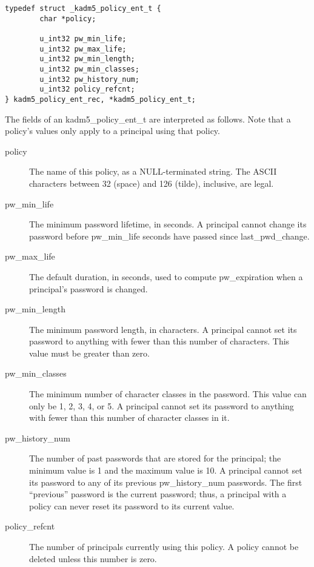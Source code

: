 \begin{verbatim}
typedef struct _kadm5_policy_ent_t {
        char *policy;

        u_int32 pw_min_life;
        u_int32 pw_max_life;
        u_int32 pw_min_length;
        u_int32 pw_min_classes;
        u_int32 pw_history_num;
        u_int32 policy_refcnt;
} kadm5_policy_ent_rec, *kadm5_policy_ent_t;
\end{verbatim}

The fields of an kadm5_policy_ent_t are interpreted as follows.
Note that a policy's values only apply to a principal using that
policy.

\begin{description}
\item[policy] The name of this policy, as a NULL-terminated string.
The ASCII characters between 32 (space) and 126 (tilde), inclusive,
are legal.

\item[pw_min_life] The minimum password lifetime, in seconds.
A principal cannot change its password before pw_min_life seconds have
passed since last_pwd_change.

\item[pw_max_life] The default duration, in seconds, used to compute
pw_expiration when a principal's password is changed.

\item[pw_min_length] The minimum password length, in characters.  A
principal cannot set its password to anything with fewer than this
number of characters.  This value must be greater than zero.

\item[pw_min_classes] The minimum number of character classes in the
password.  This value can only be 1, 2, 3, 4, or 5.  A principal cannot
set its password to anything with fewer than this number of character
classes in it.

\item[pw_history_num] The number of past passwords that are
stored for the principal; the minimum value is 1 and the maximum value
is 10.  A principal cannot set its password to any of its previous
pw_history_num passwords.  The first ``previous'' password is the
current password; thus, a principal with a policy can never reset its
password to its current value.

\item[policy_refcnt]  The number of principals currently using this policy.
A policy cannot be deleted unless this number is zero.
\end{description}

